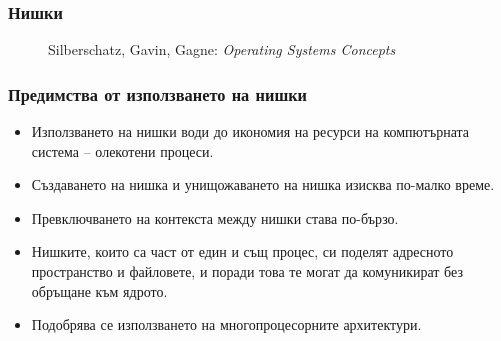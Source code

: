 \documentclass[ignorenonframetext, hyperref=unicode]{beamer}
\begin{document}
\begin{frame}\frametitle{Нишки}
\begin{figure}[h]
\center
{}
\caption{Silberschatz, Gavin, Gagne: {\em Operating Systems Concepts}}
\end{figure}
\end{frame}

\begin{frame}\frametitle{Предимства от използването на нишки}
\begin{itemize}
\item Използването на нишки води до икономия на ресурси на компютърната система
-- олекотени процеси.
\item Създаването на нишка и унищожаването на нишка изисква по-малко време.
\item Превключването на контекста между нишки става по-бързо.
\item Нишките, които са част от един и същ процес, си поделят адресното
пространство и файловете, и поради това те могат да комуникират без обръщане към
ядрото.
\item Подобрява се използването на многопроцесорните архитектури.
\end{itemize}
\end{frame}
\end{document}
